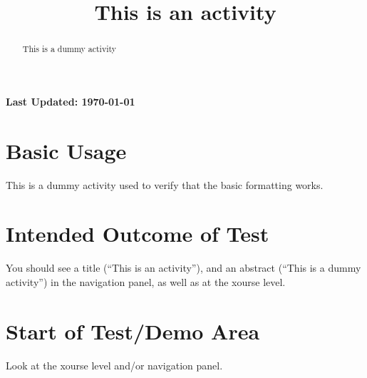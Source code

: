 \documentclass{ximera}
\title{This is an activity}
\begin{document}
\begin{abstract}
    This is a dummy activity
\end{abstract}
\maketitle

{{\Huge \bfseries Last Updated: \today}} \\


\section{Basic Usage}
This is a dummy activity used to verify that the basic formatting works.\\

\section{Intended Outcome of Test}
You should see a title (``This is an activity''), and an abstract (``This is a dummy activity'') in the navigation panel,
as well as at the xourse level.

\section{Start of Test/Demo Area}
Look at the xourse level and/or navigation panel.

\hrulefill
\end{document}
